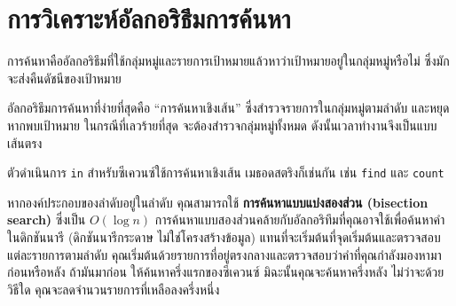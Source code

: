 \section{การวิเคราะห์อัลกอริธึมการค้นหา} %

การค้นหาคืออัลกอริธึมที่ใช้กลุ่มหมู่และรายการเป้าหมายแล้วหาว่าเป้าหมายอยู่ในกลุ่มหมู่หรือไม่ ซึ่งมักจะส่งคืนดัชนีของเป้าหมาย

อัลกอริธึมการค้นหาที่ง่ายที่สุดคือ ``การค้นหาเชิงเส้น'' ซึ่งสำรวจรายการในกลุ่มหมู่ตามลำดับ และหยุดหากพบเป้าหมาย ในกรณีที่เลวร้ายที่สุด 
จะต้องสำรวจกลุ่มหมู่ทั้งหมด ดังนั้นเวลาทำงานจึงเป็นแบบเส้นตรง

ตัวดำเนินการ {\tt in} สำหรับซีเควนซ์ใช้การค้นหาเชิงเส้น เมธอดสตริงก็เช่นกัน เช่น {\tt find} และ {\tt count}


หากองค์ประกอบของลำดับอยู่ในลำดับ คุณสามารถใช้ {\bf การค้นหาแบบแบ่งสองส่วน (bisection search)} ซึ่งเป็น $O(\log n)$ 
การค้นหาแบบสองส่วนคล้ายกับอัลกอริทึมที่คุณอาจใช้เพื่อค้นหาคำในดิกชันนารี (ดิกชันนารีกระดาษ ไม่ใช่โครงสร้างข้อมูล) 
แทนที่จะเริ่มต้นที่จุดเริ่มต้นและตรวจสอบแต่ละรายการตามลำดับ คุณเริ่มต้นด้วยรายการที่อยู่ตรงกลางและตรวจสอบว่าคำที่คุณกำลังมองหามาก่อนหรือหลัง 
ถ้ามันมาก่อน ให้ค้นหาครึ่งแรกของซีเควนซ์ มิฉะนั้นคุณจะค้นหาครึ่งหลัง ไม่ว่าจะด้วยวิธีใด คุณจะลดจำนวนรายการที่เหลือลงครึ่งหนึ่ง

